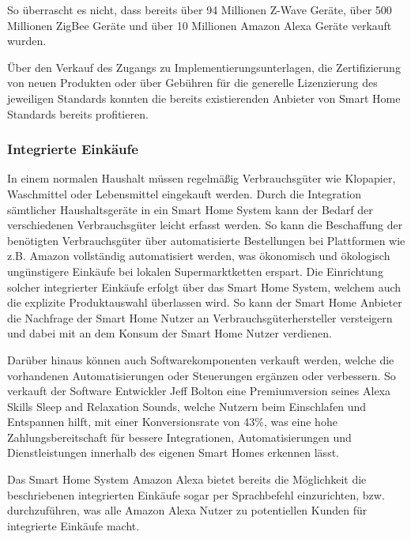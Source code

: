 So überrascht es nicht, dass bereits über 94 Millionen Z-Wave Geräte, über 500 Millionen ZigBee Geräte und über 10 Millionen Amazon Alexa Geräte verkauft wurden.

Über den Verkauf des Zugangs zu Implementierungsunterlagen, die Zertifizierung von neuen Produkten oder über Gebühren für die generelle Li­zen­zie­rung des jeweiligen Standards konnten die bereits existierenden Anbieter von Smart Home Standards bereits profitieren.

\subsubsection{Integrierte Einkäufe}

In einem normalen Haushalt müssen regelmäßig Verbrauchsgüter wie Klopapier, Waschmittel oder Lebensmittel eingekauft werden.
Durch die Integration sämtlicher Haushaltsgeräte in ein Smart Home System kann der Bedarf der verschiedenen Verbrauchsgüter leicht erfasst werden.
So kann die Beschaffung der benötigten Verbrauchsgüter über automatisierte Bestellungen bei Plattformen wie z.B. Amazon vollständig automatisiert werden, was ökonomisch und ökologisch ungünstigere Einkäufe bei lokalen Supermarktketten erspart.
Die Einrichtung solcher integrierter Einkäufe erfolgt über das Smart Home System, welchem auch die explizite Produktauswahl überlassen wird.
So kann der Smart Home Anbieter die Nachfrage der Smart Home Nutzer an Verbrauchsgüterhersteller versteigern und dabei mit an dem Konsum der Smart Home Nutzer verdienen.

Darüber hinaus können auch Softwarekomponenten verkauft werden, welche die vorhandenen Automatisierungen oder Steuerungen ergänzen oder verbessern.
So verkauft der Software Entwickler Jeff Bolton eine Premiumversion seines Alexa Skills \glqq Sleep and Relaxation Sounds\grqq{}, welche Nutzern beim Einschlafen und Entspannen hilft, mit einer Konversionsrate von 43\%, was eine hohe Zahlungsbereitschaft für bessere Integrationen, Automatisierungen und Dienstleistungen innerhalb des eigenen Smart Homes erkennen lässt.

Das Smart Home System Amazon Alexa bietet bereits die Möglichkeit die beschriebenen integrierten Einkäufe sogar per Sprachbefehl einzurichten, bzw. durchzuführen, was alle Amazon Alexa Nutzer zu potentiellen Kunden für integrierte Einkäufe macht.

